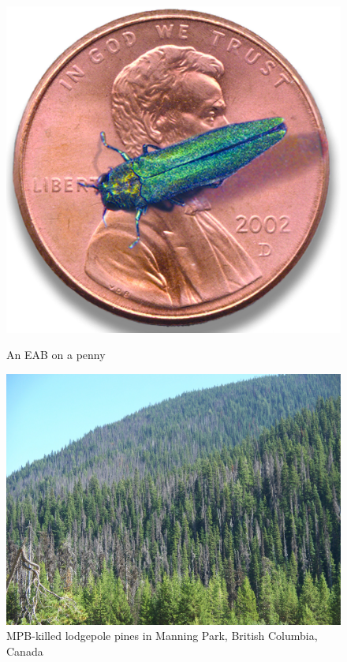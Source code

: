 \begin{figure}
    \begin{minipage}[c]{0.45\textwidth}    
        \centering
        \includegraphics[width=\textwidth]{chapter_0/Emerald_ash_borer_penny.jpg}
        \caption{An EAB on a penny \cite{eab_penny_photo}}
        \label{eabfig}
    \end{minipage}\hfill
    \begin{minipage}{0.45\textwidth} 
        \centering
        \includegraphics[width=\textwidth]{chapter_0/Pine_Beetle_in_Manning_Park.jpg}
        \caption{MPB-killed lodgepole pines in Manning Park, British Columbia, Canada \cite{mpb_manning_park}}
        \label{mpbfig}
    \end{minipage}
\end{figure}

